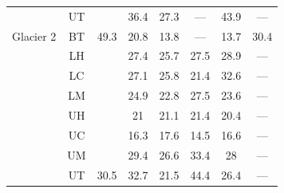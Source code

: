\documentclass[12pt]{article}
\begin{document}
\begin{table}[]
\begin{tabular}{cccccccc}
 & UT &  & 36.4 & 27.3 & --- & 43.9 & --- \\
\multirow{-8}{*}{Glacier 2} & BT & \multirow{-8}{*}{49.3} & 20.8 & 13.8 & --- & 13.7 & 30.4 \\
\rowcolor[HTML]{EFEFEF} 
\cellcolor[HTML]{EFEFEF} & LH & \cellcolor[HTML]{EFEFEF} & 27.4 & 25.7 & 27.5 & 28.9 & --- \\
\rowcolor[HTML]{EFEFEF} 
\cellcolor[HTML]{EFEFEF} & LC & \cellcolor[HTML]{EFEFEF} & 27.1 & 25.8 & 21.4 & 32.6 & --- \\
\rowcolor[HTML]{EFEFEF} 
\cellcolor[HTML]{EFEFEF} & LM & \cellcolor[HTML]{EFEFEF} & 24.9 & 22.8 & 27.5 & 23.6 & --- \\
\rowcolor[HTML]{EFEFEF} 
\cellcolor[HTML]{EFEFEF} & UH & \cellcolor[HTML]{EFEFEF} & 21 & 21.1 & 21.4 & 20.4 & --- \\
\rowcolor[HTML]{EFEFEF} 
\cellcolor[HTML]{EFEFEF} & UC & \cellcolor[HTML]{EFEFEF} & 16.3 & 17.6 & 14.5 & 16.6 & --- \\
\rowcolor[HTML]{EFEFEF} 
\cellcolor[HTML]{EFEFEF} & UM & \cellcolor[HTML]{EFEFEF} & 29.4 & 26.6 & 33.4 & 28 & --- \\
\rowcolor[HTML]{EFEFEF} 
\multirow{-7}{*}{\cellcolor[HTML]{EFEFEF}Glacier 13} & UT & \multirow{-7}{*}{\cellcolor[HTML]{EFEFEF}30.5} & 32.7 & 21.5 & 44.4 & 26.4 & ---
\end{tabular}
\end{table}
\end{document}
